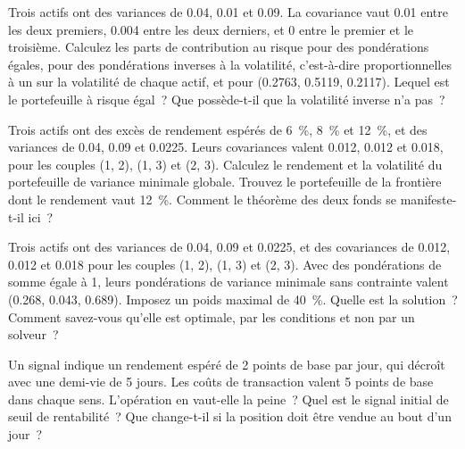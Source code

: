 \begin{question}\label{iq:iv2:portfolio-construction:20}
Trois actifs ont des variances de 0.04, 0.01 et 0.09. La covariance vaut 0.01 entre les deux premiers, 0.004 entre les deux derniers, et 0 entre le premier et le troisième. Calculez les parts de contribution au risque pour des pondérations égales, pour des pondérations inverses à la volatilité, c'est-à-dire proportionnelles à un sur la volatilité de chaque actif, et pour (0.2763, 0.5119, 0.2117). Lequel est le portefeuille à risque égal~? Que possède-t-il que la volatilité inverse n'a pas~?
\end{question}

\begin{question}\label{iq:iv2:portfolio-construction:21}
Trois actifs ont des excès de rendement espérés de 6~\%, 8~\% et 12~\%, et des variances de 0.04, 0.09 et 0.0225. Leurs covariances valent 0.012, 0.012 et 0.018, pour les couples (1, 2), (1, 3) et (2, 3). Calculez le rendement et la volatilité du portefeuille de variance minimale globale. Trouvez le portefeuille de la frontière dont le rendement vaut 12~\%. Comment le théorème des deux fonds se manifeste-t-il ici~?
\end{question}

\begin{question}\label{iq:iv2:portfolio-construction:22}
Trois actifs ont des variances de 0.04, 0.09 et 0.0225, et des covariances de 0.012, 0.012 et 0.018 pour les couples (1, 2), (1, 3) et (2, 3). Avec des pondérations de somme égale à 1, leurs pondérations de variance minimale sans contrainte valent (0.268, 0.043, 0.689). Imposez un poids maximal de 40~\%. Quelle est la solution~? Comment savez-vous qu'elle est optimale, par les conditions et non par un solveur~?
\end{question}

\begin{question}\label{iq:iv2:portfolio-construction:23}
Un signal indique un rendement espéré de 2 points de base par jour, qui décroît avec une demi-vie de 5 jours. Les coûts de transaction valent 5 points de base dans chaque sens. L'opération en vaut-elle la peine~? Quel est le signal initial de seuil de rentabilité~? Que change-t-il si la position doit être vendue au bout d'un jour~?
\end{question}

